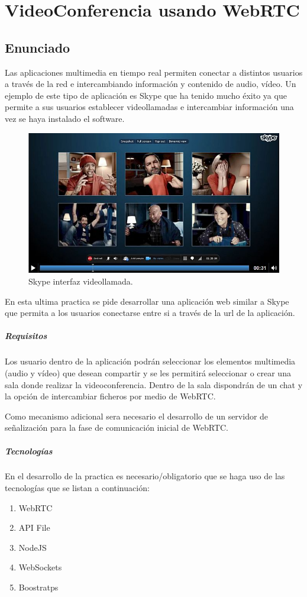 \chapter{VideoConferencia usando WebRTC}
\section{Enunciado}
Las aplicaciones multimedia en tiempo real permiten conectar a distintos usuarios a través de la red e intercambiando información y contenido de  audio, vídeo. Un ejemplo de este tipo de aplicación es Skype que ha tenido mucho éxito ya que permite a sus usuarios establecer videollamadas e intercambiar información una vez se haya instalado el software.
\begin{figure}[!h]
\begin{center}
   \includegraphics[width=0.5\linewidth]{Figures/skype}
	\decoRule
	\caption[Ejemplo sitio Web]{Skype interfaz videollamada.}
\label{fig:canvasPrimitivas}
\end{center}
\end{figure}

En esta ultima practica se pide desarrollar una aplicación web similar a Skype que permita a los usuarios conectarse entre si a través de la url de la aplicación.
\paragraph{Requisitos}
Los usuario dentro de la aplicación podrán seleccionar los elementos multimedia (audio y vídeo) que desean compartir y se les permitirá seleccionar o crear una sala donde realizar la videoconferencia. Dentro de la sala dispondrán de un chat y la opción de intercambiar ficheros por medio de WebRTC.

Como mecanismo adicional sera necesario el desarrollo de un servidor de señalización para la fase de comunicación inicial de WebRTC.
\paragraph{Tecnologías}
En el desarrollo de la practica es necesario/obligatorio que se haga uso de las tecnologías que se listan a continuación:
\begin{enumerate}
    \item WebRTC
    \item API File
    \item NodeJS
    \item WebSockets
    \item Boostratps
\end{enumerate}
